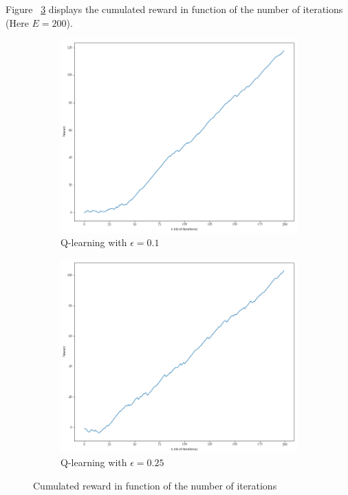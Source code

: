 \documentclass[11pt]{article}
\numberwithin{figure}{section} %
\begin{document}
Figure ~\ref{fig:Q_learning_R} displays the cumulated reward in function of the number of iterations (Here $E=200$).

\begin{figure}[H]
\centering
\begin{subfigure}{.5\textwidth}
  \centering
  \includegraphics[width=1\linewidth]{images/R10}
  \caption{Q-learning with $\epsilon = 0.1$}
  \label{fig:QL10R}
\end{subfigure}%
\begin{subfigure}{.5\textwidth}
  \centering
  \includegraphics[width=1\linewidth]{images/R25}
  \caption{Q-learning with $\epsilon = 0.25$}
  \label{fig:QL25R}
\end{subfigure}
\caption{Cumulated reward in function of the number of iterations}
\label{fig:Q_learning_R}
\end{figure}
\end{document}
